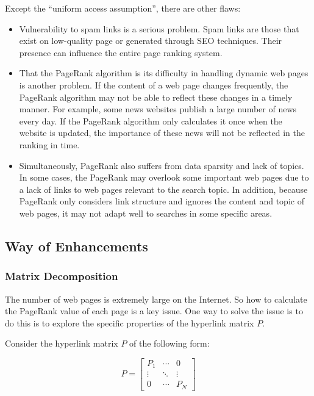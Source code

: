 \documentclass[lettersize,journal,12pt,conference]{IEEEtran}
\begin{document}
Except the ``uniform access assumption'', there are other flaws:
\begin{itemize}
	\item Vulnerability to spam links is a serious problem. Spam links are those that exist on low-quality page or generated through SEO techniques. Their presence can influence the entire page ranking system.
	\item That the PageRank algorithm is its difficulty in handling dynamic web pages is another problem. If the content of a web page changes frequently, the PageRank algorithm may not be able to reflect these changes in a timely manner. For example, some news websites publish a large number of news every day. If the PageRank algorithm only calculates it once when the website is updated, the importance of these news will not be reflected in the ranking in time.
	\item Simultaneously, PageRank also suffers from data sparsity and lack of topics. In some cases, the PageRank may overlook some important web pages due to a lack of links to web pages relevant to the search topic. In addition, because PageRank only considers link structure and ignores the content and topic of web pages, it may not adapt well to searches in some specific areas.
\end{itemize}

\subsection{Way of Enhancements}

\subsubsection{Matrix Decomposition}
The number of web pages is extremely large on the Internet. So how to calculate the PageRank value of each page is a key issue. One way to solve the issue is to do this is to explore the specific properties of the hyperlink matrix $P$.

Consider the hyperlink matrix $P$ of the following form:

\begin{equation}
	\label{eq:114514}
	P=
	\begin{bmatrix}
		P_1    & \cdots & 0      \\
		\vdots & \ddots & \vdots \\
		0      & \cdots & P_N
	\end{bmatrix}
\end{equation}
\end{document}
